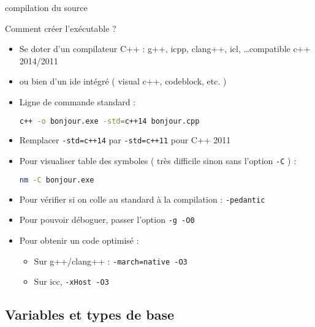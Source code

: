 \documentclass[handout,10pt]{beamer}
\begin{document}
\begin{frame}[fragile]{compilation du source}
\tiny
\begin{block}{Comment créer l'exécutable ?}
\begin{itemize}
\item Se doter d'un compilateur C++ : g++, icpp, clang++, icl, \ldots compatible c++ 2014/2011
\item ou bien d'un ide intégré  ( visual c++, codeblock, etc. )
\item Ligne de commande standard :
\begin{lstlisting}[language=bash]
c++ -o bonjour.exe -std=c++14 bonjour.cpp
\end{lstlisting}
\item Remplacer \lstinline$-std=c++14$ par \lstinline$-std=c++11$ pour C++ 2011
\item Pour visualiser table des symboles ( très difficile sinon sans l'option \lstinline$-C$ ) :
\begin{lstlisting}[language=bash]
nm -C bonjour.exe
\end{lstlisting}
\item Pour vérifier si on colle au standard à la compilation : \lstinline$-pedantic$
\item Pour pouvoir déboguer, passer l'option \lstinline$-g -O0$
\item Pour obtenir un code optimisé : 
\begin{itemize}
\item Sur g++/clang++ : \lstinline$-march=native -O3$
\item Sur icc, \lstinline$-xHost -O3$
\end{itemize}
\end{itemize}
\end{block}
\end{frame}

\subsection{Variables et types de base}
\end{document}
